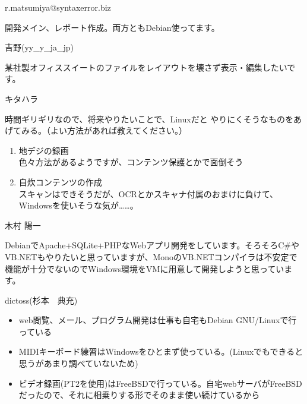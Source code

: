 \begin{prework}{ r.matsumiya@syntaxerror.biz }

開発メイン、レポート作成。両方ともDebian使ってます。
\end{prework}

\begin{prework}{ 吉野(yy\_y\_ja\_jp) }

某社製オフィススイートのファイルをレイアウトを壊さず表示・編集したいです。

\end{prework}

\begin{prework}{ キタハラ }

時間ギリギリなので、将来やりたいことで、Linuxだと
やりにくそうなものをあげてみる。（よい方法があれば教えてください。）
\begin{enumerate}
\item 地デジの録画 \\
色々方法があるようですが、コンテンツ保護とかで面倒そう
\item 自炊コンテンツの作成\\
スキャンはできそうだが、OCRとかスキャナ付属のおまけに負けて、Windowsを使いそうな気が……。
\end{enumerate}

\end{prework}

\begin{prework}{ 木村 陽一 }

DebianでApache+SQLite+PHPなWebアプリ開発をしています。そろそろC\#やVB.NETもやりたいと思っていますが、MonoのVB.NETコンパイラは不安定で機能が十分でないのでWindows環境をVMに用意して開発しようと思っています。
\end{prework}

\begin{prework}{ dictoss(杉本　典充) }

\begin{itemize}
\item web閲覧、メール、プログラム開発は仕事も自宅もDebian GNU/Linuxで行っている
\item MIDIキーボード練習はWindowsをひとまず使っている。(Linuxでもできると思うがあまり調べていないため)
\item ビデオ録画(PT2を使用)はFreeBSDで行っている。自宅webサーバがFreeBSDだったので、それに相乗りする形でそのまま使い続けているから
\end{itemize}

\end{prework}

